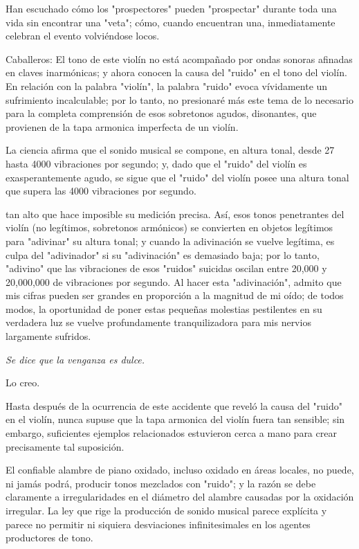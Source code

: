 \documentclass[12pt]{book}
\begin{document}
Han escuchado cómo los "prospectores" pueden "prospectar" durante toda una vida sin encontrar una "veta"; cómo, cuando encuentran una, inmediatamente celebran el evento volviéndose locos.

Caballeros: El tono de este violín no está acompañado por ondas sonoras afinadas en claves inarmónicas; y ahora conocen la causa del "ruido" en el tono del violín. En relación con la palabra "violín", la palabra "ruido" evoca vívidamente un sufrimiento incalculable; por lo tanto, no presionaré más este tema de lo necesario para la completa comprensión de esos sobretonos agudos, disonantes, que provienen de la tapa armonica imperfecta de un violín.

La ciencia afirma que el sonido musical se compone, en altura tonal, desde 27 hasta 4000 vibraciones por segundo; y, dado que el "ruido" del violín es exasperantemente agudo, se sigue que el "ruido" del violín posee una altura tonal que supera las 4000 vibraciones por segundo.

tan alto que hace imposible su medición precisa. Así, esos tonos penetrantes del violín (no legítimos, sobretonos armónicos) se convierten en objetos legítimos para "adivinar" su altura tonal; y cuando la adivinación se vuelve legítima, es culpa del "adivinador" si su "adivinación" es demasiado baja; por lo tanto, "adivino" que las vibraciones de esos "ruidos" suicidas oscilan entre 20,000 y 20,000,000 de vibraciones por segundo. Al hacer esta "adivinación", admito que mis cifras pueden ser grandes en proporción a la magnitud de mi oído; de todos modos, la oportunidad de poner estas pequeñas molestias pestilentes en su verdadera luz se vuelve profundamente tranquilizadora para mis nervios largamente sufridos.

\textit{Se dice que la venganza es dulce.}

Lo creo.

Hasta después de la ocurrencia de este accidente que reveló la causa del "ruido" en el violín, nunca supuse que la tapa armonica del violín fuera tan sensible; sin embargo, suficientes ejemplos relacionados estuvieron cerca a mano para crear precisamente tal suposición.

El confiable alambre de piano oxidado, incluso oxidado en áreas locales, no puede, ni jamás podrá, producir tonos mezclados con "ruido"; y la razón se debe claramente a irregularidades en el diámetro del alambre causadas por la oxidación irregular. La ley que rige la producción de sonido musical parece explícita y parece no permitir ni siquiera desviaciones infinitesimales en los agentes productores de tono.
\end{document}
